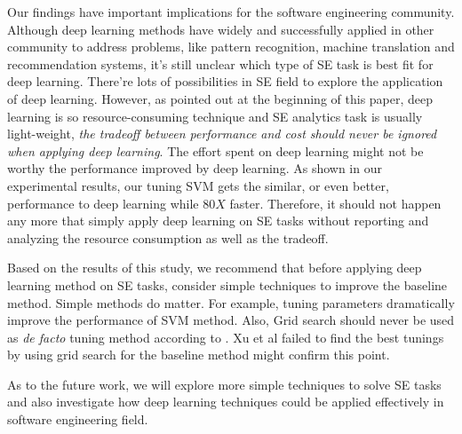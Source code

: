 \documentclass[sigconf,review, anonymous]{acmart}
\theoremstyle{break}
\begin{document}
Our findings have important implications for the software engineering community.
Although deep learning methods have widely and successfully applied in other community
to address problems, like pattern recognition, machine translation and recommendation
systems, it's still unclear which type of SE task is best fit for deep learning. There're lots
of possibilities in SE field to explore the application of deep learning. However, as pointed out
at the beginning of this paper, deep learning is so resource-consuming technique
and SE analytics task is usually light-weight,  {\it the  tradeoff between performance and cost should never
be ignored when applying deep learning}. The effort spent on deep learning might not be worthy the performance
improved by deep learning. As shown in our experimental results, our tuning SVM gets the similar,
 or even better, performance to deep learning while $80X$ faster.
Therefore, it should not happen any more that simply apply deep learning on SE tasks
without reporting and analyzing the resource consumption as well as the tradeoff.  

Based on the results of this study, we recommend that before applying 
deep learning method on SE tasks, consider simple techniques to improve the baseline method.
Simple methods do matter. For example, tuning parameters dramatically improve the 
performance of SVM method.  Also, Grid search should
never be used as {\it de facto} tuning method according to \cite{fu2016differential,bergstra2012random}. 
Xu et al failed to find the best tunings by using grid search for
the baseline method might confirm this point.

As to the future work, we will explore more simple techniques to solve SE tasks and also
investigate how deep learning techniques could be applied effectively in software engineering
field. 






















 
\end{document}
